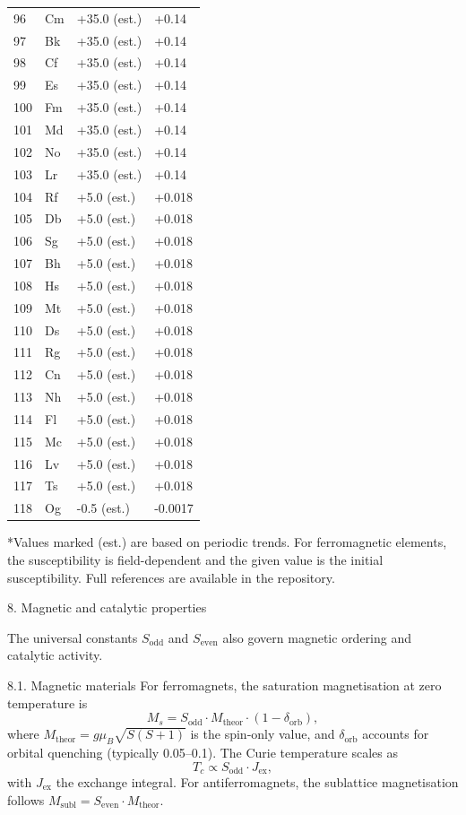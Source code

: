 \documentclass[12pt,a4paper]{article}
\begin{document}
\begin{longtable}{p{0.6cm}p{1.2cm}p{2.5cm}p{2.5cm}}
		96 & Cm & +35.0 (est.) & +0.14 \\
		97 & Bk & +35.0 (est.) & +0.14 \\
		98 & Cf & +35.0 (est.) & +0.14 \\
		99 & Es & +35.0 (est.) & +0.14 \\
		100& Fm & +35.0 (est.) & +0.14 \\
		101& Md & +35.0 (est.) & +0.14 \\
		102& No & +35.0 (est.) & +0.14 \\
		103& Lr & +35.0 (est.) & +0.14 \\
		104& Rf & +5.0 (est.) & +0.018 \\
		105& Db & +5.0 (est.) & +0.018 \\
		106& Sg & +5.0 (est.) & +0.018 \\
		107& Bh & +5.0 (est.) & +0.018 \\
		108& Hs & +5.0 (est.) & +0.018 \\
		109& Mt & +5.0 (est.) & +0.018 \\
		110& Ds & +5.0 (est.) & +0.018 \\
		111& Rg & +5.0 (est.) & +0.018 \\
		112& Cn & +5.0 (est.) & +0.018 \\
		113& Nh & +5.0 (est.) & +0.018 \\
		114& Fl & +5.0 (est.) & +0.018 \\
		115& Mc & +5.0 (est.) & +0.018 \\
		116& Lv & +5.0 (est.) & +0.018 \\
		117& Ts & +5.0 (est.) & +0.018 \\
		118& Og & -0.5 (est.) & -0.0017 \\
		\bottomrule
	\end{longtable}
	*Values marked (est.) are based on periodic trends. For ferromagnetic elements, the susceptibility is field-dependent and the given value is the initial susceptibility. Full references are available in the repository.
	
	8. Magnetic and catalytic properties
	
	The universal constants \(S_{\text{odd}}\) and \(S_{\text{even}}\) also govern magnetic ordering and catalytic activity.
	
	8.1. Magnetic materials
	For ferromagnets, the saturation magnetisation at zero temperature is
	\[
	M_s = S_{\text{odd}} \cdot M_{\text{theor}} \cdot (1 - \delta_{\text{orb}}),
	\]
	where \(M_{\text{theor}} = g \mu_B \sqrt{S(S+1)}\) is the spin‑only value, and \(\delta_{\text{orb}}\) accounts for orbital quenching (typically 0.05–0.1). The Curie temperature scales as
	\[
	T_c \propto S_{\text{odd}} \cdot J_{\text{ex}},
	\]
	with \(J_{\text{ex}}\) the exchange integral. For antiferromagnets, the sublattice magnetisation follows \(M_{\text{subl}} = S_{\text{even}} \cdot M_{\text{theor}}\).
	
\end{document}

